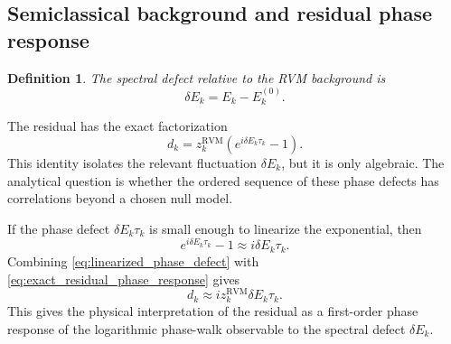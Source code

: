\documentclass[12pt]{article}
\numberwithin{equation}{section}
\newtheorem{definition}[theorem]{Definition}
\newcommand{\RVM}{\mathrm{RVM}}
\begin{document}
\subsection{Semiclassical background and residual phase response}
\label{sec:semiclassical_background_residual_response}

\begin{definition}
\label{def:spectral_defect}
The spectral defect relative to the RVM background is
\begin{equation}
\delta E_k
=
E_k-E_k^{(0)}.
\label{eq:def_spectral_defect}
\end{equation}
\end{definition}


\noindent The residual has the exact factorization
\begin{equation}
d_k
=
z_k^{\RVM}\left(e^{i\delta E_k\tau_k}-1\right).
\label{eq:exact_residual_phase_response}
\end{equation}
This identity isolates the relevant fluctuation \(\delta E_k\), but it is only algebraic.  The analytical question is whether the ordered sequence of these phase defects has correlations beyond a chosen null model.


\noindent If the phase defect \(\delta E_k\tau_k\) is small enough to linearize the exponential, then
\begin{equation}
e^{i\delta E_k\tau_k}-1
\approx
i\delta E_k\tau_k.
\label{eq:linearized_phase_defect}
\end{equation}
Combining \eqref{eq:linearized_phase_defect} with \eqref{eq:exact_residual_phase_response} gives
\begin{equation}
d_k
\approx
i z_k^{\RVM}\delta E_k\tau_k.
\label{eq:linear_residual_response}
\end{equation}
This gives the physical interpretation of the residual as a first-order phase response of the logarithmic phase-walk observable to the spectral defect \(\delta E_k\).
\end{document}
